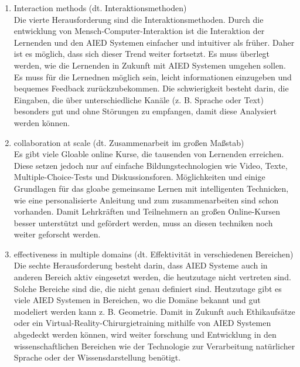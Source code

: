 \begin{enumerate}
    \item Interaction methods (dt. Interaktionsmethoden) \\
    Die vierte Herausforderung sind die Interaktionsmethoden. Durch die entwicklung von Mensch-Computer-Interaktion ist die Interaktion der Lernenden und den AIED Systemen einfacher und intuitiver als früher.
    Daher ist es möglich, dass sich dieser Trend weiter fortsetzt. Es muss überlegt werden, wie die Lernenden in Zukunft mit AIED Systemen umgehen sollen.
    Es muss für die Lernednen möglich sein, leicht informationen einzugeben und bequemes Feedback zurückzubekommen. Die schwierigkeit besteht darin, die Eingaben, die über unterschiedliche Kanäle (z. B. Sprache oder Text) besonders gut und ohne Störungen zu empfangen, damit diese Analysiert werden können. \cite[S. 11]{Pinkwart.2016}


    \item collaboration at scale (dt. Zusammenarbeit im großen Maßstab) \\
    Es gibt viele Gloable online Kurse, die tausenden von Lernenden erreichen. Diese setzen jedoch nur auf einfache Bildungstechnologien wie Video, Texte, Multiple-Choice-Tests und Diskussionsforen.
    Möglichkeiten und einige Grundlagen für das gloabe gemeinsame Lernen mit intelligenten Technicken, wie eine personalisierte Anleitung und zum zusammenarbeiten sind schon vorhanden. 
    Damit Lehrkräften und Teilnehmern an großen Online-Kursen besser unterstützt und gefördert werden, muss an diesen techniken noch weiter geforscht werden. \cite[S. 11]{Pinkwart.2016}
    
    \item effectiveness in multiple domains (dt. Effektivität in verschiedenen Bereichen) \\
    Die sechte Herausforderung besteht darin, dass AIED Systeme auch in anderen Bereich aktiv eingesetzt werden, die heutzutage nicht vertreten sind. Solche Bereiche sind die, die nicht genau definiert sind.
    Heutzutage gibt es viele AIED Systemen in Bereichen, wo die Domäne bekannt und gut modeliert werden kann z. B. Geometrie.
    Damit in Zukunft auch Ethikaufsätze oder ein Virtual-Reality-Chirurgietraining mithilfe von AIED Systemen abgedeckt werden können, wird weiter forschung und Entwicklung in den wissenschaftlichen Bereichen wie der Technologie zur Verarbeitung natürlicher Sprache oder der Wissensdarstellung benötigt. \cite[S. 11f]{Pinkwart.2016}
     

\end{enumerate}
